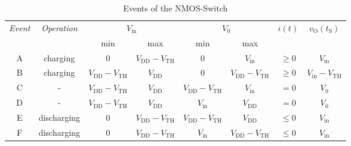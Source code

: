 \documentclass{article}[11pt]
\begin{document}
\begin{table}[H]
\centering
\caption{Events of the NMOS-Switch}
\begin{tabular}{cccccccc}
\toprule
\multirow{2}{*}{\textit{Event}} & \multirow{2}{*}{\textit{Operation}} & \multicolumn{2}{c}{$V_{\mathrm{in}}$}                                 & \multicolumn{2}{c}{$V_{0}$}                                           & \multirow{2}{*}{$i(t)$}   & \multirow{2}{*}{$v_{\mathrm{O}}(t_{\mathrm{S}})$}  \\ 
~                               & ~                                   & min                               & max                               & min                               & max                               & ~                         & ~                                                  \\ \midrule
A                               & charging                            & 0                                 & $V_{\mathrm{DD}}-V_{\mathrm{TH}}$ & 0                                 & $V_{\mathrm{in}}$                 & $\geq0$                   & $V_{\mathrm{in}}$                                  \\ 
B                               & charging                            & $V_{\mathrm{DD}}-V_{\mathrm{TH}}$ & $V_{\mathrm{DD}}$                 & 0                                 & $V_{\mathrm{DD}}-V_{\mathrm{TH}}$ & $\geq0$                   & $V_{\mathrm{in}}-V_{\mathrm{TH}}$                  \\ 
C                               & -                                   & $V_{\mathrm{DD}}-V_{\mathrm{TH}}$ & $V_{\mathrm{DD}}$                 & $V_{\mathrm{DD}}-V_{\mathrm{TH}}$ & $V_{\mathrm{in}}$                 & $=0$                      & $V_{0}$                                            \\ 
D                               & -                                   & $V_{\mathrm{DD}}-V_{\mathrm{TH}}$ & $V_{\mathrm{DD}}$                 & $V_{\mathrm{in}}$                 & $V_{\mathrm{DD}}$                 & $=0$                      & $V_{0}$                                            \\ 
E                               & discharging                         & 0                                 & $V_{\mathrm{DD}}-V_{\mathrm{TH}}$ & $V_{\mathrm{DD}}-V_{\mathrm{TH}}$ & $V_{\mathrm{DD}}$                 & $\leq0$                   & $V_{\mathrm{in}}$                                  \\ 
F                               & discharging                         & 0                                 & $V_{\mathrm{DD}}-V_{\mathrm{TH}}$ & $V_{\mathrm{in}}$                 & $V_{\mathrm{DD}}-V_{\mathrm{TH}}$ & $\leq0$                   & $V_{\mathrm{in}}$                                  \\ \toprule
\end{tabular}
\label{tab:os}
\end{table}
\end{document}
